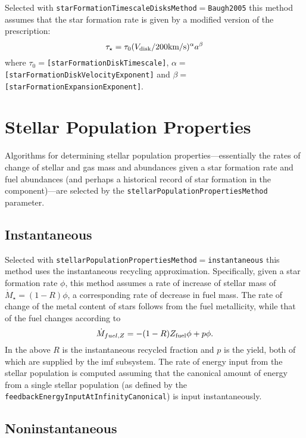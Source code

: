 Selected with {\tt starFormationTimescaleDisksMethod}$=${\tt Baugh2005} this method assumes that the star formation rate is given by a modified version of the \cite{baugh_can_2005} prescription:
\begin{equation}
\tau_\star = \tau_0 (V_{\rm disk}/200\hbox{km/s})^\alpha a^\beta
\end{equation}
where $\tau_0=${\tt [starFormationDiskTimescale]}, $\alpha=${\tt [starFormationDiskVelocityExponent]} and $\beta=${\tt [starFormationExpansionExponent]}.

\section{Stellar Population Properties}\label{sec:StellarPopulationProperties}

Algorithms for determining stellar population properties---essentially the rates of change of stellar and gas mass and abundances given a star formation rate and fuel abundances (and perhaps a historical record of star formation in the component)---are selected by the {\tt stellarPopulationPropertiesMethod} parameter.

\subsection{Instantaneous}

Selected with {\tt stellarPopulationPropertiesMethod}$=${\tt instantaneous} this method uses the instantaneous recycling approximation. Specifically, given a star formation rate $\phi$, this method assumes a rate of increase of stellar mass of $\dot{M}_\star=(1-R)\phi$, a corresponding rate of decrease in fuel mass. The rate of change of the metal content of stars follows from the fuel metallicity, while that of the fuel changes according to
\begin{equation}
 \dot{M}_{fuel,Z} = - (1-R) Z_{\rm fuel} \phi + p \phi.
\end{equation}
In the above $R$ is the instantaneous recycled fraction and $p$ is the yield, both of which are supplied by the \gls{imf} subsystem. The rate of energy input from the stellar population is computed assuming that the canonical amount of energy from a single stellar population (as defined by the {\tt feedbackEnergyInputAtInfinityCanonical}) is input instantaneously.

\subsection{Noninstantaneous}

